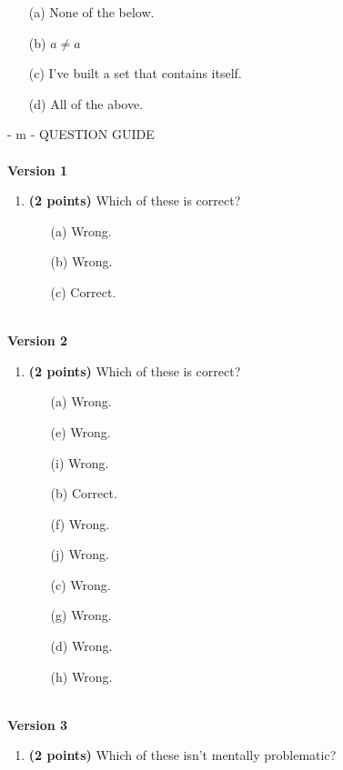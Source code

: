 \documentclass[12pt]{amsart}
\begin{document}
\begin{enumerate}[resume]
\begin{minipage}[t]{1.0\linewidth}\begin{itemize}\item[(a)]  None of the below.  \item[(b)]  $a \neq a$ \item[(c)]  I've built a set that contains itself. \item[(d)]   All of the above. \end{itemize}\end{minipage} \vfill \end{enumerate} - m - QUESTION GUIDE \\$ $ \\ {\bf Version 1} \\\begin{enumerate}[resume]
\item {\bf (2 points)} 
 Which of these is correct?

\begin{minipage}[t]{1.0\linewidth}\begin{multicols}{3}\begin{itemize}\item[(a)]  Wrong. \item[(b)]  Wrong. \item[(c)]  Correct. \end{itemize}\end{multicols}\end{minipage} \vfill \end{enumerate}$ $ \\ {\bf Version 2} \\\begin{enumerate}[resume]
\item {\bf (2 points)} 
 Which of these is correct?

\begin{minipage}[t]{1.0\linewidth}\begin{multicols}{4}\begin{itemize}\item[(a)]  Wrong. \item[(e)]  Wrong. \item[(i)]  Wrong. \item[(b)]  Correct. \item[(f)]  Wrong. \item[(j)]  Wrong. \item[(c)]  Wrong. \item[(g)]  Wrong. \item[] \item[(d)]  Wrong. \item[(h)]  Wrong. \item[] \end{itemize}\end{multicols}\end{minipage} \vfill \end{enumerate}$ $ \\ {\bf Version 3} \\\begin{enumerate}[resume]
\item {\bf (2 points)} 
 Which of these isn't mentally problematic?


\end{enumerate}
\end{document}
